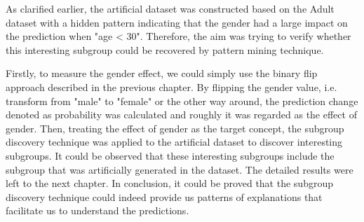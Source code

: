 %

As clarified earlier, the artificial dataset was constructed based on the Adult dataset with a hidden pattern indicating that the gender had a large impact on the prediction when "age < 30". Therefore, the aim was trying to verify whether this interesting subgroup could be recovered by pattern mining technique. 

Firstly, to measure the gender effect, we could simply use the binary flip approach described in the previous chapter. By flipping the gender value, i.e. transform from "male" to "female" or the other way around, the prediction change denoted as probability was calculated and roughly it was regarded as the effect of gender. Then, treating the effect of gender as the target concept, the subgroup discovery technique was applied to the artificial dataset to discover interesting subgroups. It could be observed that these interesting subgroups include the subgroup that was artificially generated in the dataset. The detailed results were left to the next chapter. In conclusion, it could be proved that the subgroup discovery technique could indeed provide us patterns of explanations that facilitate us to understand the predictions. 


